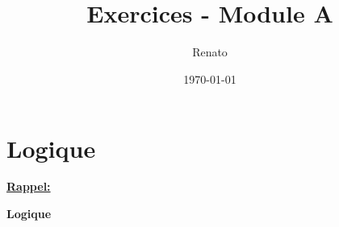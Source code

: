 \documentclass{report}
\title{\Large{\bsc{MATH-F-112 - Math\'{e}matiques}}\\
  Exercices - Module A
  }
\author{Renato \bsc{Costa Ribeiro}}
\date{\today}
\begin{document}
\maketitle
\tableofcontents

\chapter{Logique}
\begin{flushleft} \begin{large}\textbf{\underline{Rappel:}}\end{large}\end{flushleft}

\begin{flushleft} \begin{large}\textbf{Logique}\end{large}\end{flushleft}
\end{document}
